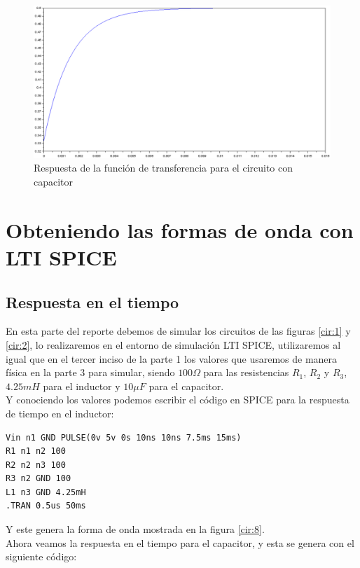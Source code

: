 \documentclass[letterpaper,spanish,12pt]{report}
\begin{document}
\begin{figure}[h]
	\centering
		\includegraphics[width=1.00\textwidth]{FormadeondaC.eps}
	\caption{Respuesta de la funci\'on de transferencia para el circuito con capacitor}
	\label{cir:7}
\end{figure}

	\section{Obteniendo las formas de onda con LTI SPICE}

	\subsection{Respuesta en el tiempo}

En esta parte del reporte debemos de simular los circuitos de las figuras \ref{cir:1} y \ref{cir:2}, lo realizaremos en el entorno de simulaci\'on LTI SPICE, utilizaremos al igual que en el tercer inciso de la parte 1 los valores que usaremos de manera f\'isica en la parte 3 para simular, siendo $100\Omega$ para las resistencias $R_{1}$, $R_{2}$ y $R_{3}$, $4.25mH$ para el inductor y $10\mu F$ para el capacitor. \\ Y conociendo los valores podemos escribir el c\'odigo en SPICE para la respuesta de tiempo en el inductor:

\begin{verbatim}
Vin n1 GND PULSE(0v 5v 0s 10ns 10ns 7.5ms 15ms)
R1 n1 n2 100
R2 n2 n3 100
R3 n2 GND 100
L1 n3 GND 4.25mH
.TRAN 0.5us 50ms
\end{verbatim}

Y este genera la forma de onda mostrada en la figura \ref{cir:8}. \\ Ahora veamos la respuesta en el tiempo para el capacitor, y esta se genera con el siguiente c\'odigo:
\end{document}
